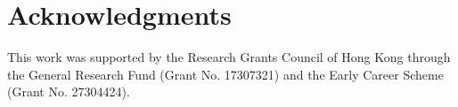 \documentclass[11pt,a4paper]{article}
\theoremstyle{plain}
\theoremstyle{remark}
\theoremstyle{remark}
\begin{document}









\section*{Acknowledgments}
This work was supported by the Research Grants Council of Hong Kong through the General Research Fund (Grant No. 17307321) and the Early Career Scheme (Grant No. 27304424).


\newpage
\appendix
\renewcommand{\theprop}{\thesection.\arabic{prop}} 
\renewcommand{\thecorollary}{\thesection.\arabic{corollary}} 
\renewcommand{\thetheorem}{\thesection.\arabic{theorem}} 
\renewcommand{\thelemma}{\thesection.\arabic{lemma}} 
\renewcommand{\thealgorithm}{\thesection.\arabic{algorithm}}
\renewcommand{\theequation}{\thesection.\arabic{equation}}
\renewcommand{\thefigure}{\thesection.\arabic{figure}}
\renewcommand{\thetable}{\thesection.\arabic{table}}
\renewcommand{\theexample}{\thesection.\arabic{example}}
\end{document}
